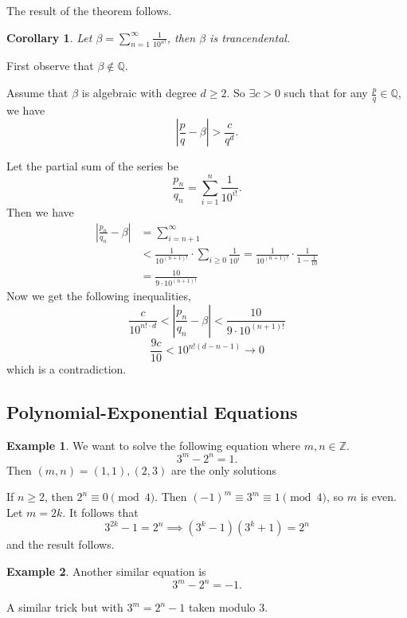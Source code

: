 \documentclass[11pt]{article}
\newtheorem{cor}{Corollary}[thm]
\theoremstyle{definition}
\newtheorem{example}{Example}[section]
\newcommand{\abs}[1]{\left\lvert#1\right\rvert} %
\newcommand{\QQ}{\mathbb{Q}}
\newcommand{\ZZ}{\mathbb{Z}}
\begin{document}
	The result of the theorem follows.
\qedhere

\begin{cor}
	Let $\beta = \sum_{n=1}^\infty \frac1{10^{n!}}$, then $\beta$ is trancendental.
\end{cor}
\proof
	First observe that $\beta \notin \QQ$. 

	Assume that $\beta$ is algebraic with degree $d\ge2$. 
	So $\exists c > 0$ such that for any $\frac{p}{q} \in \QQ$, we have 
	$$ \abs{\frac{p}{q} - \beta} > \frac{c}{q^d} . $$

	Let the partial sum of the series be
	$$ \frac{p_n}{q_n} = \sum_{i=1}^n \frac1{10^{i!}} . $$
	Then we have 
	\begin{align*}
		\abs{\frac{p_n}{q_n} - \beta} &= \sum_{i={n+1}}^\infty \\
		&< \frac1{10^{(n+1)!}} \cdot \sum_{i\ge0} \frac1{10^i} = \frac1{10^{(n+1)!}} \cdot \frac1{1-\frac1{10}} \\
		&= \frac{10}{9\cdot 10^{(n+1)!}}
	\end{align*}
	Now we get the following inequalities, 
	$$ \frac{c}{10^{n!\cdot d}} < \abs{\frac{p_n}{q_n} - \beta} < \frac{10}{9 \cdot 10^{(n+1)!}} $$
	$$ \frac{9c}{10} < 10^{n! (d-n-1)} \to 0 $$
	which is a contradiction.
\qedhere




\subsection{Polynomial-Exponential Equations}

\begin{example}
	We want to solve the following equation where $m,n\in\ZZ$. 
	$$ 3^m - 2^n = 1 . $$
	Then $(m,n) = (1,1), (2,3)$ are the only solutions
\end{example}
\proof
	If $n \ge 2$, then $2^n \equiv 0 \pmod{4}$. Then $(-1)^m \equiv 3^m \equiv 1 \pmod{4}$, so $m$ is even.
	Let $m = 2k$. It follows that 
	$$ 3^{2k} - 1 = 2^n \implies (3^k-1)(3^k+1) = 2^n $$
	and the result follows.
\qedhere

\begin{example}
	Another similar equation is 
	$$ 3^m - 2^n = -1 . $$
\end{example} 
\proof 
	A similar trick but with $3^m = 2^n-1$ taken modulo $3$.
\qedhere
\end{document}
